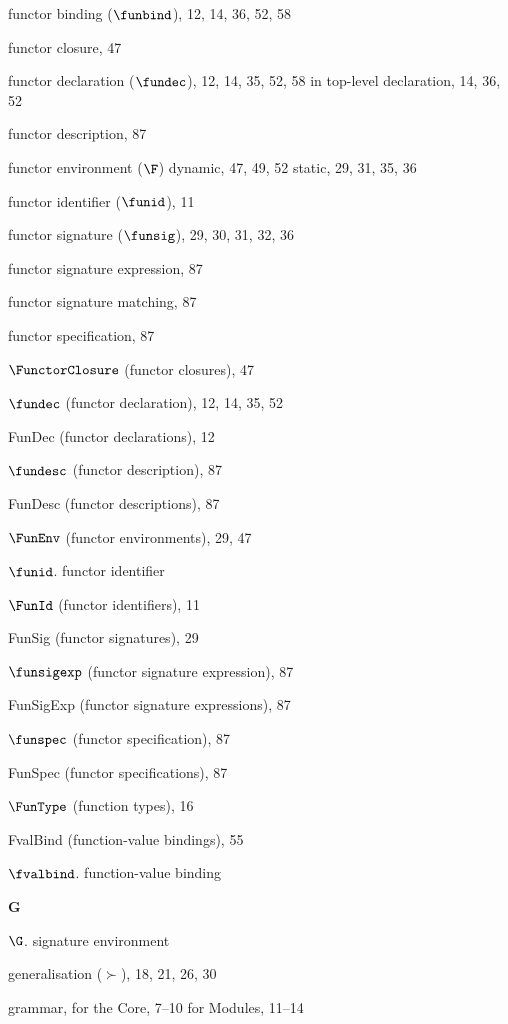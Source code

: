 \begin{theindex}
\item functor binding ($\funbind$), 12, 14, 36, 52, 58
\item functor closure, 47
\item functor declaration ($\fundec$), 12, 14, 35, 52, 58
\subitem in top-level declaration, 14, 36, 52
\item functor description, 87
\item functor environment ($\F$)
\subitem dynamic, 47, 49, 52
\subitem static, 29, 31, 35, 36
\item functor identifier ($\funid$), 11
\item functor signature ($\funsig$), 29, 30, 31, 32, 36
\item functor signature expression, 87
\item functor signature matching, 87
\item functor specification, 87
\item $\FunctorClosure$ (functor closures), 47
\item $\fundec$ (functor declaration), 12, 14, 35, 52
\item FunDec (functor declarations), 12
\item $\fundesc$ (functor description), 87
\item FunDesc (functor descriptions), 87
\item $\FunEnv$ (functor environments), 29, 47
\item $\funid$. \see functor identifier
\item $\FunId$ (functor identifiers), 11
\item FunSig (functor signatures), 29
\item $\funsigexp$ (functor signature expression), 87
\item FunSigExp (functor signature expressions), 87
\item $\funspec$ (functor specification), 87
\item FunSpec (functor specifications), 87
\item $\FunType$ (function types), 16
\item FvalBind (function-value bindings), 55
\item $\fvalbind$. \see function-value binding
\indexspace
\parbox{64mm}{\hfil{\large\bf G}\hfil}
\indexspace
\item $\G$. \see signature environment
\item generalisation ($\succ$), 18, 21, 26, 30
\item grammar,
\subitem for the Core, 7--10
\subitem for Modules, 11--14

\end{theindex}
